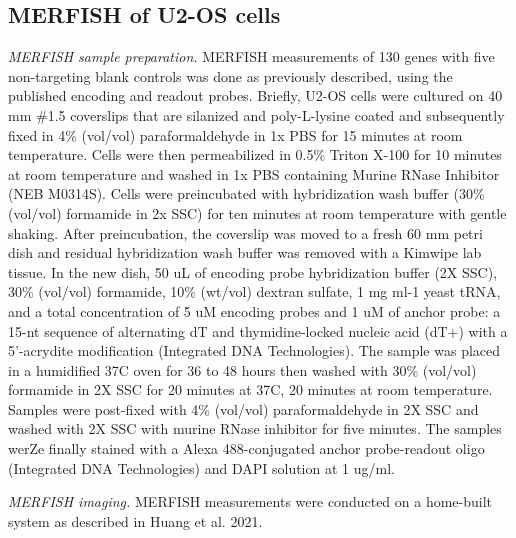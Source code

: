 \subsection{MERFISH of U2-OS cells}
\textit{MERFISH sample preparation.} MERFISH measurements of 130 genes with five non-targeting blank controls was done as previously described, using the published encoding\cite{moffittHighthroughputSinglecellGeneexpression2016} and readout probes\cite{huangCTCFMediatesDosage2021}. Briefly, U2-OS cells were cultured on 40 mm \#1.5 coverslips that are silanized and poly-L-lysine coated\cite{moffittHighthroughputSinglecellGeneexpression2016} and subsequently fixed in 4\% (vol/vol) paraformaldehyde in 1x PBS for 15 minutes at room temperature. Cells were then permeabilized in 0.5\% Triton X-100 for 10 minutes at room temperature and washed in 1x PBS containing Murine RNase Inhibitor (NEB M0314S). Cells were preincubated with hybridization wash buffer (30\% (vol/vol) formamide in 2x SSC) for ten minutes at room temperature with gentle shaking. After preincubation, the coverslip was moved to a fresh 60 mm petri dish and residual hybridization wash buffer was removed with a Kimwipe lab tissue. In the new dish, 50 uL of encoding probe hybridization buffer (2X SSC), 30\% (vol/vol) formamide, 10\% (wt/vol) dextran sulfate, 1 mg ml-1 yeast tRNA, and a total concentration of 5 uM encoding probes and 1 uM of anchor probe: a 15-nt sequence of alternating dT and thymidine-locked nucleic acid (dT+) with a 5'-acrydite modification (Integrated DNA Technologies). The sample was placed in a humidified 37C oven for 36 to 48 hours then washed with 30\% (vol/vol) formamide in 2X SSC for 20 minutes at 37C, 20 minutes at room temperature. Samples were post-fixed with 4\% (vol/vol) paraformaldehyde in 2X SSC and washed with 2X SSC with murine RNase inhibitor for five minutes. The samples werZe finally stained with a Alexa 488-conjugated anchor probe-readout oligo (Integrated DNA Technologies) and DAPI solution at 1 ug/ml. 

\textit{MERFISH imaging.} MERFISH measurements were conducted on a home-built system as described in Huang et al. 2021\cite{huangCTCFMediatesDosage2021}.

